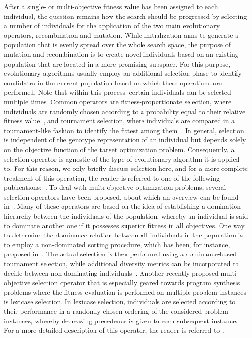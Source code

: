 After a single- or multi-objective fitness value has been assigned to each individual, the question remains how the search should be progressed by selecting a number of individuals for the application of the two main evolutionary operators, recombination and mutation.
While initialization aims to generate a population that is evenly spread over the whole search space, the purpose of mutation and recombination is to create novel individuals based on an existing population that are located in a more promising subspace.  
For this purpose, evolutionary algorithms usually employ an additional selection phase to identify candidates in the current population based on which these operations are performed.
Note that within this process, certain individuals can be selected multiple times.
Common operators are fitness-proportionate selection, where individuals are randomly chosen according to a probability equal to their relative fitness value~\cite{lipowski2012roulette}, and tournament selection, where individuals are compared in a tournament-like fashion to identify the fittest among them~\cite{fang2010review}.
In general, selection is independent of the genotype representation of an individual but depends solely on the objective function of the target optimization problem.
Consequently, a selection operator is agnostic of the type of evolutionary algorithm it is applied to. 
For this reason, we only briefly discuss selection here, and for a more complete treatment of this operation, the reader is referred to one of the following publications:~\cite{back1997handbook,beyer2002evolution,goldberg1991comparative}.
To deal with multi-objective optimization problems, several selection operators have been proposed, about which an overview can be found in~\cite{coello2007evolutionary,deb2011multi,deb2015multi}.
Many of these operators are based on the idea of establishing a domination hierarchy between the individuals of the population, whereby an individual is said to dominate another one if it possesses superior fitness in all objectives.
One way to determine the dominance relation between all individuals in the population is to employ a non-dominated sorting procedure, which has been, for instance, proposed in~\cite{deb2002fast,deb2013evolutionary}.
The actual selection is then performed using a dominance-based tournament selection, while additional diversity metrics can be incorporated to decide between non-dominating individuals~\cite{coello2007evolutionary}.
Another recently proposed multi-objective selection operator that is especially geared towards program synthesis problems where the fitness evaluation is performed on multiple problem instances is lexicase selection.
In lexicase selection, individuals are selected according to their performance in a randomly chosen ordering of the considered problem instances, whereby decreasing precedence is given to each subsequent instance.
For a more detailed description of this operator, the reader is referred to~\cite{helmuth2014solving,la2016epsilon}.
 
